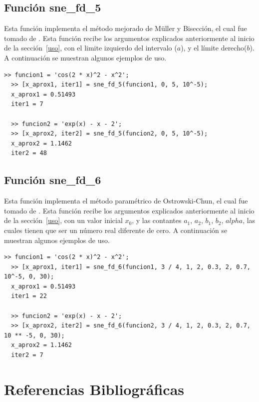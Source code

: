 \documentclass[12pt]{article}
\begin{document}
\subsection{Función sne\_fd\_5}
Esta función implementa el método mejorado de Müller y Bisección, el cual fue tomado de \cite{wu2005improved}. Esta función recibe los argumentos explicados anteriormente al inicio de la sección~\ref{uso}, con el limite izquierdo del intervalo ($a$), y el límite derecho($b$). A continuación se muestran algunos ejemplos de uso.

\begin{minipage}{\linewidth}
\begin{lstlisting}[frame = single]
  >> funcion1 = 'cos(2 * x)^2 - x^2';
  >> [x_aprox1, iter1] = sne_fd_5(funcion1, 0, 5, 10^-5);
  x_aprox1 = 0.51493
  iter1 = 7

  >> funcion2 = 'exp(x) - x - 2';
  >> [x_aprox2, iter2] = sne_fd_5(funcion2, 0, 5, 10^-5);
  x_aprox2 = 1.1462
  iter2 = 48
\end{lstlisting}
\end{minipage}

\subsection{Función sne\_fd\_6}
Esta función implementa el método paramétrico de Ostrowski-Chun, el cual fue tomado de \cite{cordero2015solving}. Esta función recibe los argumentos explicados anteriormente al inicio de la sección~\ref{uso}, con un valor inicial $x_{0}$, y las contantes $a_{1}$, $a_{2}$, $b_{1}$, $b_{2}$, $alpha$, las cuales tienen que ser un número real diferente de cero. A continuación se muestran algunos ejemplos de uso.

\begin{minipage}{\linewidth}
\begin{lstlisting}[frame = single]
  >> funcion1 = 'cos(2 * x)^2 - x^2';
  >> [x_aprox1, iter1] = sne_fd_6(funcion1, 3 / 4, 1, 2, 0.3, 2, 0.7, 10^-5, 0, 30);
  x_aprox1 = 0.51493
  iter1 = 22

  >> funcion2 = 'exp(x) - x - 2';
  >> [x_aprox2, iter2] = sne_fd_6(funcion2, 3 / 4, 1, 2, 0.3, 2, 0.7, 10 ** -5, 0, 30);
  x_aprox2 = 1.1462
  iter2 = 7
\end{lstlisting}
\end{minipage}

\newpage
\section{Referencias Bibliográficas}
\nocite{*}

\end{document}
